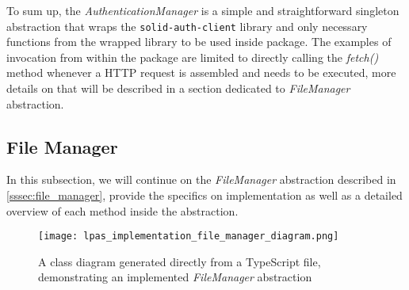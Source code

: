 To sum up, the \textit{AuthenticationManager} is a simple and straightforward singleton abstraction that wraps the \texttt{solid-auth-client} library and only necessary functions from the wrapped library to be used inside \lpas{} package. The examples of invocation from within the \lpas{} package are limited to directly calling the \textit{fetch()} method whenever a HTTP request is assembled and needs to be executed, more details on that will be described in a section dedicated to \textit{FileManager} abstraction.  

\subsection{File Manager}
\label{sssec:file_manager_implementation}

In this subsection, we will continue on the \textit{FileManager} abstraction described in \autoref{sssec:file_manager}, provide the specifics on implementation as well as a detailed overview of each method inside the abstraction.  

\begin{figure}[h]
\centering
\texttt{[image: lpas\_implementation\_file\_manager\_diagram.png]}
\caption{A class diagram generated directly from a TypeScript file, demonstrating an implemented \textit{FileManager} abstraction}
\label{fig:lpas_filemanager_implementation_class}
\end{figure}

